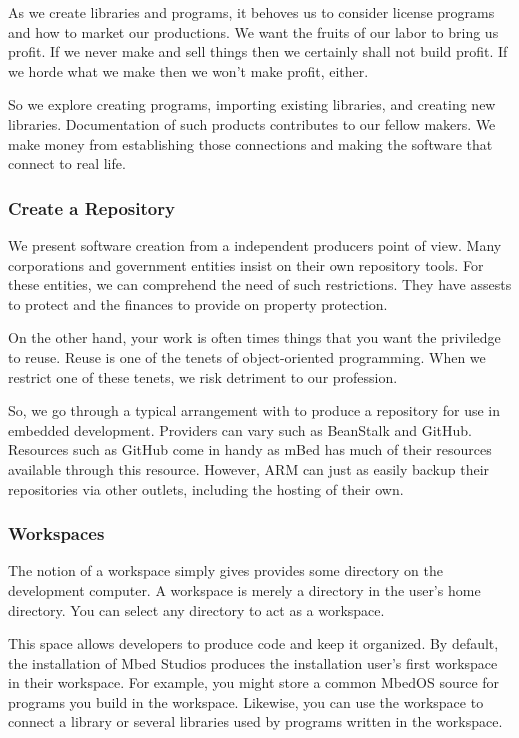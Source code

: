 \documentclass{article}
\begin{document}
As we create libraries and programs, it behoves us to consider license programs and how to market our productions. We want the fruits of our labor to bring us profit. If we never make and sell things then we certainly shall not build profit.  If we horde what we make then we won't make profit, either.

So we explore creating programs, importing existing libraries, and creating new libraries. Documentation of such products contributes to our fellow makers.  We make money from establishing those connections and making the software that connect to real life. 

\subsubsection{Create a Repository} %
\label{ssub:create_a_repository}

We present software creation from a independent producers point of view.  Many corporations and government entities insist on their own repository tools.  For these entities, we can comprehend the need of such restrictions.  They have assests to protect and the finances to provide on property protection.  

On the other hand, your work is often times things that you want the priviledge to reuse.  Reuse is one of the tenets of object-oriented programming.  When we restrict one of these tenets, we risk detriment to our profession.  

So, we go through a typical arrangement with to produce a repository for use in embedded development.  Providers can vary such as BeanStalk and GitHub.  Resources such as GitHub come in handy as mBed has much of their resources available through this resource.  However, ARM can just as easily backup their repositories via other outlets, including the hosting of their own. 




\subsubsection{Workspaces} %
\label{ssub:workspaces}

The notion of a workspace simply gives provides some directory on the development computer.  A workspace is merely a directory in the user's home directory.  You can select any directory to act as a workspace.  

This space allows developers to produce code and keep it organized.   By default, the installation of Mbed Studios produces the installation user's first workspace in their workspace.  For example, you might store a common MbedOS source for programs you build in the workspace.  Likewise, you can use the workspace to connect a library or several libraries used by programs written in the workspace.
\end{document}
